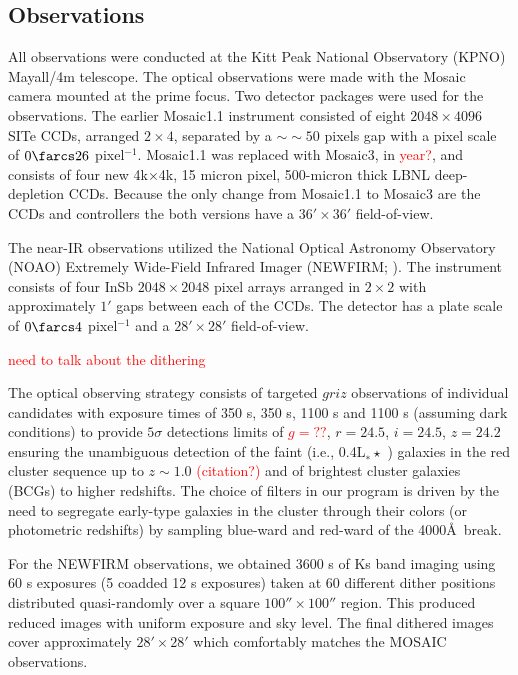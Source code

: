 \documentclass[apj, revtex4]{emulateapj}
\newcommand{\editorial}[1]{\textcolor{red}{#1}}
\begin{document}
\subsection{Observations}\label{sec: observations}
All observations were conducted at the Kitt Peak National Observatory (KPNO) Mayall/4m telescope. The optical observations were made with the Mosaic camera mounted at the prime focus. Two detector packages were used for the observations. The earlier Mosaic1.1 instrument consisted of eight $2048\times4096$ SITe CCDs, arranged $2\times4$, separated by a $∼\sim50$ pixels gap with a pixel scale of $0\farcs26$ pixel$^{-1}$. Mosaic1.1 was replaced with Mosaic3, in \editorial{year?},  and consists of four new 4k$\times$4k, 15 micron pixel, 500-micron thick LBNL deep-depletion CCDs. Because the only change from Mosaic1.1 to Mosaic3 are the CCDs and controllers the both versions have a $36' \times 36'$ field-of-view.

The near-IR observations utilized the National Optical Astronomy Observatory (NOAO) Extremely Wide-Field Infrared Imager (NEWFIRM; \citealt{Probst2004}). The instrument consists of four InSb $2048 \times 2048$ pixel arrays arranged in $2\times2$ with approximately $1'$ gaps between each of the CCDs. The detector has a plate scale of $0\farcs4$ pixel$^{-1}$ and a $28'\times28'$ field-of-view.

\editorial{need to talk about the dithering}

The optical observing strategy consists of targeted $griz$ observations of individual candidates with exposure times of 350 s, 350 s, 1100 s and 1100 s (assuming dark conditions) to provide $5\sigma$ detections limits of \editorial{$g=??$}, $r = 24.5$, $i = 24.5$, $z = 24.2$ ensuring the unambiguous detection of the faint (i.e., 0.4L$_∗\star$ ) galaxies in the red cluster sequence up to $z \sim 1.0$ \editorial{(citation?)} and of brightest cluster galaxies (BCGs) to higher redshifts. The choice of filters in our program is driven by the need to segregate early-type galaxies in the cluster through their colors (or photometric redshifts) by sampling blue-ward and red-ward of the 4000\AA\ break.

For the NEWFIRM observations, we obtained 3600 s of Ks band imaging using 60 s exposures (5 coadded 12 s exposures) taken at 60 different dither positions distributed quasi-randomly over a square $100''\times100''$ region. This produced reduced images with uniform exposure and sky level. The final dithered images cover approximately $28'\times28'$ which comfortably matches the MOSAIC observations.
\end{document}
